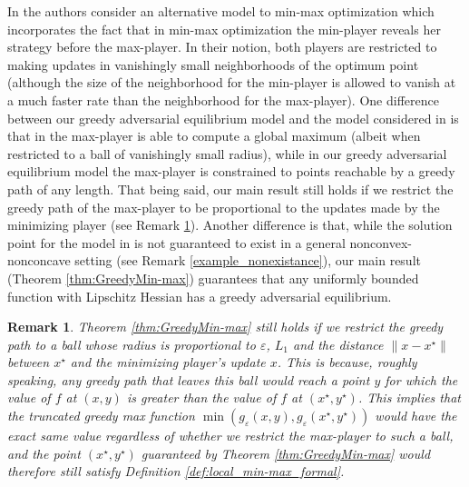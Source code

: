 \documentclass[11pt,letterpaper]{article}
\renewcommand{\epsilon}{\varepsilon}
\newtheorem{remark}[theorem]{Remark}
\begin{document}
 
 
 In \cite{minmax_Jordan} the authors consider an alternative model to min-max optimization which incorporates the fact that in min-max optimization the min-player reveals her strategy before the max-player.  In their notion, both players are restricted to making updates in vanishingly small neighborhoods of the optimum point (although the size of the neighborhood for the min-player is allowed to vanish at a much faster rate than the neighborhood for the max-player). 
 One difference between our greedy adversarial equilibrium model and the model considered in \cite{minmax_Jordan} is that in \cite{minmax_Jordan} the max-player is able to compute a  global maximum (albeit when restricted to a ball of vanishingly small radius), while in our greedy adversarial equilibrium model the max-player is constrained to points reachable by a greedy path of any length.  That being said, our main result still holds if we restrict the greedy path of the max-player to be proportional to the updates made by the minimizing player (see Remark \ref{remark_neighborhood}). Another difference is that, while the solution point for the model in \cite{minmax_Jordan} is not guaranteed to exist in a general nonconvex-nonconcave setting (see Remark \ref{example_nonexistance}), our main result (Theorem \ref{thm:GreedyMin-max}) guarantees that any uniformly bounded function with Lipschitz Hessian has a greedy adversarial equilibrium.


  \begin{remark} \label{remark_neighborhood}
%
Theorem \ref{thm:GreedyMin-max} still holds if we restrict the greedy path to a ball whose radius is proportional to $\epsilon$, $L_1$ and the distance $\|x-x^\star \|$ between $x^\star$ and the minimizing player's update $x$. 
%
This is because, roughly speaking, any greedy path that leaves this ball would reach a point $y$ for which the value of $f$ at $(x,y)$ is greater than the value of $f$ at $(x^\star, y^\star)$. 
%
This implies that the truncated greedy max function $\min(g_\epsilon(x,y), g_\epsilon(x^\star,y^\star))$ would have the exact same value regardless of whether we restrict the max-player to such a ball, and the point $(x^\star, y^\star)$ guaranteed by Theorem \ref{thm:GreedyMin-max} would therefore still satisfy Definition \ref{def:local_min-max_formal}.
\end{remark}
\end{document}
